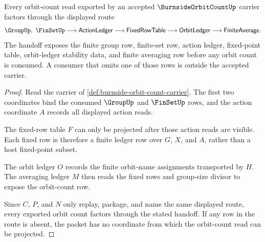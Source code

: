 \begin{theorem}
\label{thm:burnside-orbit-count-fixed-row-handoff}
Every orbit-count read exported by an accepted $\BurnsideOrbitCountUp$ carrier factors through the displayed route
$$
\GroupUp,\ \FinSetUp \longrightarrow \mathsf{ActionLedger} \longrightarrow \mathsf{FixedRowTable} \longrightarrow \mathsf{OrbitLedger} \longrightarrow \mathsf{FiniteAverage}.
$$
The handoff exposes the finite group row, finite-set row, action ledger, fixed-point table, orbit-ledger stability data, and finite averaging row before any orbit count is consumed. A consumer that omits one of those rows is outside the accepted carrier.
\end{theorem}
\begin{proof}
Read the carrier of \autoref{def:burnside-orbit-count-carrier}. The first two coordinates bind the consumed $\GroupUp$ and $\FinSetUp$ rows, and the action coordinate $A$ records all displayed action reads.

The fixed-row table $F$ can only be projected after those action reads are visible. Each fixed row is therefore a finite ledger row over $G$, $X$, and $A$, rather than a host fixed-point subset.

The orbit ledger $O$ records the finite orbit-name assignments transported by $H$. The averaging ledger $M$ then reads the fixed rows and group-size divisor to expose the orbit-count row.

Since $C$, $P$, and $N$ only replay, package, and name the same displayed route, every exported orbit count factors through the stated handoff. If any row in the route is absent, the packet has no coordinate from which the orbit-count read can be projected.
\end{proof}




